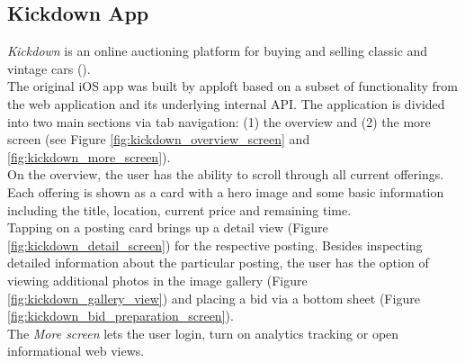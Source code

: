 \subsection{Kickdown App} \label{section:kickdown_feature_presentation}
\textit{Kickdown} is an online auctioning platform for buying and selling classic and vintage cars (\cite{Kickdown2021}).\\
The original iOS app was built by apploft based on a subset of functionality from the web application and its underlying internal API.
The application is divided into two main sections via tab navigation: (1) the overview and (2) the more screen (see Figure \ref{fig:kickdown_overview_screen} and \ref{fig:kickdown_more_screen}).\\
On the overview, the user has the ability to scroll through all current offerings. Each offering is shown as a card with a hero image 
and some basic information including the title, location, current price and remaining time.\\
Tapping on a posting card brings up a detail view (Figure \ref{fig:kickdown_detail_screen}) for the respective posting.
Besides inspecting detailed information about the particular posting, the user has the option of viewing additional photos in the image gallery (Figure \ref{fig:kickdown_gallery_view}) and placing a bid via a bottom sheet (Figure \ref{fig:kickdown_bid_preparation_screen}).\\
The \emph{More screen} lets the user login, turn on analytics tracking or open informational web views.

